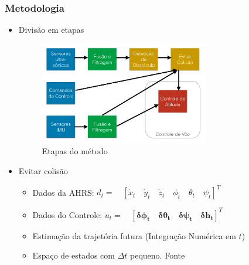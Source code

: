 \documentclass{beamer}
\begin{document}
\begin{frame}[allowframebreaks]
	
	\frametitle{Metodologia}
	
	\begin{itemize}
		
		
	
		\item Divisão em etapas
		
		\begin{figure}[h]
			\centering
			\includegraphics[keepaspectratio = true,
			width=0.7\textwidth]{img/etapasMetodo.png}
			\caption{Etapas do método}
			\label{fig:etapasMetodo}
		\end{figure}
		
	\framebreak
	
	\item Evitar colisão
	
	\begin{itemize}
		
		\item Dados da AHRS: $d_{ t }=\quad { \left[ { \dot { x }  }_{ t }\quad { \dot { y }  }_{ t }\quad { \dot { z }  }_{ t }\quad { \phi  }_{ t }\quad { \theta  }_{ t }\quad { \psi  }_{ t } \right]  }^{ T }$
		
		\item Dados do Controle: ${ u }_{ t }=\quad { \left[ \mathbf{{ \delta \phi  }_{ t }\quad { \delta \theta  }_{ t }\quad { \delta \psi  }_{ t }\quad { \delta h }_{ t }} \right]  }^{ T }$	
			
	
	\item Estimação da trajetória futura (Integração Numérica em $t$)
	
		
		\item Espaço de estados com $\Delta t$ pequeno. Fonte \cite{Basit2014}
		

\end{itemize}
\end{itemize}
\end{frame}
\end{document}
